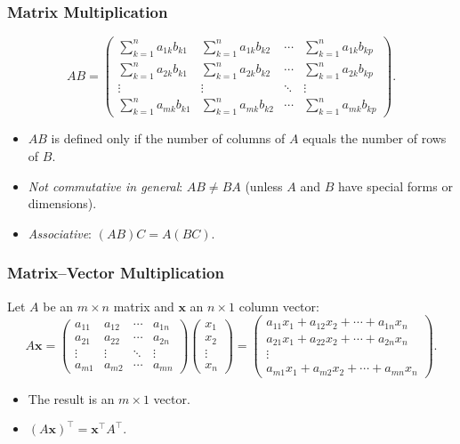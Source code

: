 \subsubsection{Matrix Multiplication}
\[
A B =
\begin{pmatrix}
\sum_{k=1}^n a_{1k} b_{k1} & \sum_{k=1}^n a_{1k} b_{k2} & \cdots & \sum_{k=1}^n a_{1k} b_{kp} \\
\sum_{k=1}^n a_{2k} b_{k1} & \sum_{k=1}^n a_{2k} b_{k2} & \cdots & \sum_{k=1}^n a_{2k} b_{kp} \\
\vdots                   & \vdots                   & \ddots & \vdots                   \\
\sum_{k=1}^n a_{mk} b_{k1} & \sum_{k=1}^n a_{mk} b_{k2} & \cdots & \sum_{k=1}^n a_{mk} b_{kp}
\end{pmatrix}.
\]
\begin{itemize}
\item $AB$ is defined only if the number of columns of $A$ equals the number of rows of $B$.
\item \emph{Not commutative in general}: $AB \neq BA$ (unless $A$ and $B$ have special forms or dimensions).
\item \emph{Associative}: $(AB)C = A(BC)$.
\end{itemize}

\subsubsection{Matrix--Vector Multiplication}
Let $A$ be an $m \times n$ matrix and $\mathbf{x}$ an $n \times 1$ column vector:
\[
A \mathbf{x} =
\begin{pmatrix}
a_{11} & a_{12} & \cdots & a_{1n} \\
a_{21} & a_{22} & \cdots & a_{2n} \\
\vdots & \vdots & \ddots & \vdots \\
a_{m1} & a_{m2} & \cdots & a_{mn}
\end{pmatrix}
\begin{pmatrix}
x_1 \\
x_2 \\
\vdots \\
x_n
\end{pmatrix}
=
\begin{pmatrix}
a_{11} x_1 + a_{12} x_2 + \cdots + a_{1n} x_n \\
a_{21} x_1 + a_{22} x_2 + \cdots + a_{2n} x_n \\
\vdots \\
a_{m1} x_1 + a_{m2} x_2 + \cdots + a_{mn} x_n
\end{pmatrix}.
\]
\begin{itemize}
\item The result is an $m \times 1$ vector.
\item $(A\mathbf{x})^\top = \mathbf{x}^\top A^\top$.
\end{itemize}


